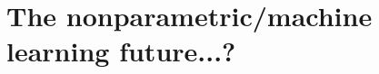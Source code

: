 \documentclass[aspectratio=169,10pt]{beamer}
\begin{document}





\section{The nonparametric/machine learning future...?}
\end{document}
